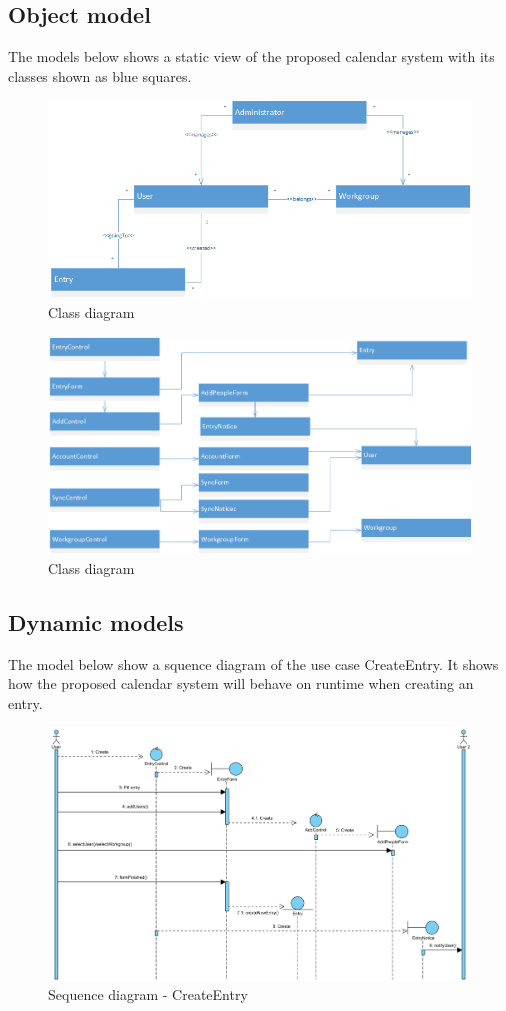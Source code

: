 \subsection{Object model}
The models below shows a static view of the proposed calendar system with its classes shown as blue squares.
\begin{figure}[h]
\centering
\includegraphics[scale = 0.6]{class21}
\caption{Class diagram}
\end{figure}
\begin{figure}[h]
\centering
\includegraphics[scale = 0.5]{class22}
\pagebreak
\caption{Class diagram}
\end{figure}
\pagebreak
\subsection{Dynamic models}
The model below show a squence diagram of the use case CreateEntry. It shows how the proposed calendar system will behave on runtime when creating an entry.
\begin{figure}[h]
\centering
\includegraphics[scale = 0.5]{sequenceDiagram2}
\caption{Sequence diagram - CreateEntry}
\end{figure}